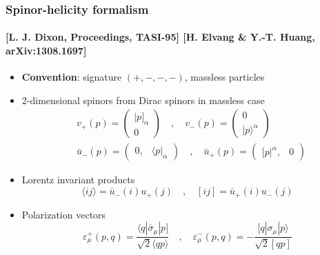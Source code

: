 \documentclass[english]{beamer}
\begin{document}
\begin{frame}[shrink=20]
\frametitle{Spinor-helicity formalism}
\framesubtitle{\tiny\color{blue}[L. J. Dixon, Proceedings, TASI-95]
[H. Elvang \& Y.-T. Huang, arXiv:1308.1697]
\color{black}\normalsize}
\begin{itemize}
\item<1-> \textbf{Convention}: signature $(+,-,-,-)$, massless particles


\item<2-> 2-dimensional spinors from Dirac spinors in massless case
\begin{equation*}
\begin{split}
& v_+(p) = \begin{pmatrix}
|p]_\alpha \\ 0
\end{pmatrix} %
\quad,\quad
v_-(p) = \begin{pmatrix}
0 \\ |p\rangle^{\dot{\alpha}}
\end{pmatrix} %
\\
& \bar{u}_-(p) = \begin{pmatrix} 
0, & \langle p |_{\dot{\alpha}}\end{pmatrix}
\quad,\quad
\bar{u}_+(p) = \begin{pmatrix} [ p|^\alpha, & 0 \end{pmatrix}
\end{split}
\end{equation*} 

\item<4-> Lorentz invariant products
\begin{equation*}
 \langle ij \rangle = \bar{u}_-(i)u_+(j) 
\quad,\quad
 [ij] = \bar{u}_+(i)u_-(j)
\end{equation*}

\item<5-> Polarization vectors
\begin{equation*}
\varepsilon^+_\mu (p, q) = \frac{\langle q | \bar{\sigma}_\mu |p]}{\sqrt{2}\langle qp \rangle}
\quad,\quad
\varepsilon^-_\mu (p, q) = -\frac{[q|\sigma_\mu | p\rangle}{\sqrt{2}[qp]}
\end{equation*}

\end{itemize}

\end{frame}
\end{document}
